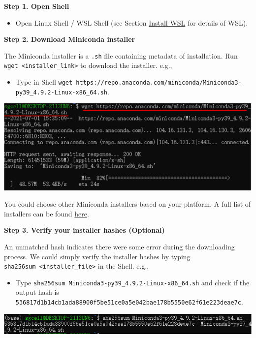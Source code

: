 \documentclass[
]{book}
\providecommand{\tightlist}{%
  \setlength{\itemsep}{0pt}\setlength{\parskip}{0pt}}
\begin{document}
\textbf{Step 1. Open Shell}

\begin{itemize}
\tightlist
\item
  Open Linux Shell / WSL Shell (see Section \protect\hyperlink{wsl_install}{Install WSL} for details of WSL).
\end{itemize}

\textbf{Step 2. Download Miniconda installer}

The Miniconda installer is a \texttt{.sh} file containing metadata of installation. Run \texttt{wget\ \textless{}installer\_link\textgreater{}} to download the installer. e.g.,

\begin{itemize}
\tightlist
\item
  Type in Shell \texttt{wget\ https://repo.anaconda.com/miniconda/Miniconda3-py39\_4.9.2-Linux-x86\_64.sh}.
\end{itemize}

\begin{center}\includegraphics[width=0.65\linewidth]{./images/conda_download_installer} \end{center}

You could choose other Miniconda installers based on your platform. A full list of installers can be found \href{https://docs.conda.io/en/latest/miniconda.html}{here}.

\textbf{Step 3. Verify your installer hashes (Optional)}

An unmatched hash indicates there were some error during the downloading process. We could simply verify the installer hashes by typing \texttt{sha256sum\ \textless{}installer\_file\textgreater{}} in the Shell. e.g.,

\begin{itemize}
\tightlist
\item
  Type \texttt{sha256sum\ Miniconda3-py39\_4.9.2-Linux-x86\_64.sh} and check if the output hash is \texttt{536817d1b14cb1ada88900f5be51ce0a5e042bae178b5550e62f61e223deae7c}.
\end{itemize}

\begin{center}\includegraphics[width=0.65\linewidth]{./images/conda_verify_hash} \end{center}
\end{document}
